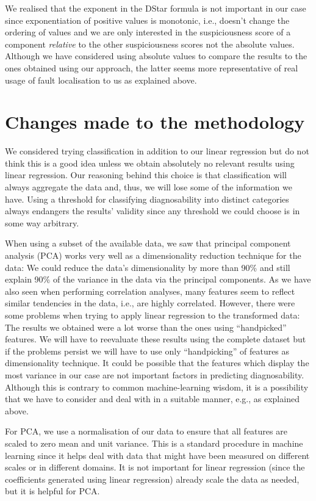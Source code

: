 \documentclass{scrartcl}
\begin{document}
We realised that the exponent in the DStar formula is not important in our case
since exponentiation of positive values is monotonic, i.e., doesn't change the
ordering of values and we are only interested in the suspiciousness score of a
component \emph{relative} to the other suspiciousness scores not the absolute
values. Although we have considered using absolute values to compare the results
to the ones obtained using our approach, the latter seems more representative of
real usage of fault localisation to us as explained above. 

\section{Changes made to the methodology}

We considered trying classification in addition to our linear regression but do
not think this is a good idea unless we obtain absolutely no relevant results
using linear regression. Our reasoning behind this choice is that classification
will always aggregate the data and, thus, we will lose some of the information
we have. Using a threshold for classifying diagnosability into distinct
categories always endangers the results' validity since any threshold we could
choose is in some way arbitrary.

When using a subset of the available data, we saw that principal component
analysis (PCA) works very well as a dimensionality reduction technique for the
data: We could reduce the data's dimensionality by more than 90\% and still
explain 90\% of the variance in the data via the principal components. As we
have also seen when performing correlation analyses, many features seem to
reflect similar tendencies in the data, i.e., are highly correlated. However,
there were some problems when trying to apply linear regression to the
transformed data: The results we obtained were a lot worse than the ones using
\enquote{handpicked} features. We will have to reevaluate these results using
the complete dataset but if the problems persist we will have to use only
\enquote{handpicking} of features as dimensionality technique. It could be
possible that the features which display the most variance in our case are not
important factors in predicting diagnosability. Although this is contrary to
common machine-learning wisdom, it is a possibility that we have to consider and
deal with in a suitable manner, e.g., as explained above.

For PCA, we use a normalisation of our data to ensure that all features are
scaled to zero mean and unit variance. This is a  standard procedure in machine
learning since it helps deal with data that might have been measured on
different scales or in different domains. It is not important for linear
regression (since the coefficients generated using linear regression) already
scale the data as needed, but it is helpful for PCA.
\end{document}
